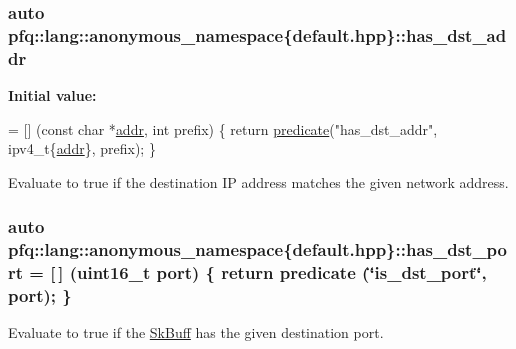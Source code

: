 \subsubsection[{\texorpdfstring{has\+\_\+dst\+\_\+addr}{has_dst_addr}}]{\setlength{\rightskip}{0pt plus 5cm}auto pfq\+::lang\+::anonymous\+\_\+namespace\{default.\+hpp\}\+::has\+\_\+dst\+\_\+addr}\hypertarget{namespacepfq_1_1lang_1_1anonymous__namespace_02default_8hpp_03_a0a53822af0ed8ea341f16a1da5ea83e3}{}\label{namespacepfq_1_1lang_1_1anonymous__namespace_02default_8hpp_03_a0a53822af0ed8ea341f16a1da5ea83e3}
{\bfseries Initial value\+:}
\begin{DoxyCode}
= [] (\textcolor{keyword}{const} \textcolor{keywordtype}{char} *\hyperlink{namespacepfq_1_1lang_1_1anonymous__namespace_02default_8hpp_03_a13cabe468839119d8d68540e3c60718b}{addr}, \textcolor{keywordtype}{int} prefix)
        \{
            \textcolor{keywordflow}{return} \hyperlink{namespacepfq_1_1lang_aca9adafc436b7f851621b979fa1aaf88}{predicate}(\textcolor{stringliteral}{"has\_dst\_addr"}, ipv4\_t\{\hyperlink{namespacepfq_1_1lang_1_1anonymous__namespace_02default_8hpp_03_a13cabe468839119d8d68540e3c60718b}{addr}\}, prefix);
        \}
\end{DoxyCode}


Evaluate to {\ttfamily true} if the destination IP address matches the given network address. 

\subsubsection[{\texorpdfstring{has\+\_\+dst\+\_\+port}{has_dst_port}}]{\setlength{\rightskip}{0pt plus 5cm}auto pfq\+::lang\+::anonymous\+\_\+namespace\{default.\+hpp\}\+::has\+\_\+dst\+\_\+port = \mbox{[}$\,$\mbox{]} (uint16\+\_\+t {\bf port}) \{ return {\bf predicate} (\char`\"{}is\+\_\+dst\+\_\+port\char`\"{}, port); \}}\hypertarget{namespacepfq_1_1lang_1_1anonymous__namespace_02default_8hpp_03_afa71ece0f4178d0200c0388f503eef14}{}\label{namespacepfq_1_1lang_1_1anonymous__namespace_02default_8hpp_03_afa71ece0f4178d0200c0388f503eef14}


Evaluate to {\ttfamily true} if the \hyperlink{structpfq_1_1lang_1_1SkBuff}{Sk\+Buff} has the given destination port. 

